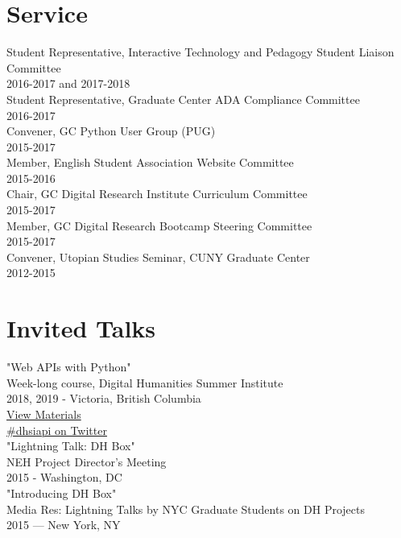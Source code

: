 \documentclass[11pt]{article}
\begin{document}
\section*{Service}
\label{sec:orgheadline6}
Student Representative, Interactive Technology and Pedagogy Student Liaison Committee\\
2016-2017 and 2017-2018\\

Student Representative, Graduate Center ADA Compliance Committee\\
2016-2017\\

Convener, GC Python User Group (PUG)\\
2015-2017\\

Member, English Student Association Website Committee\\
2015-2016\\

Chair, GC Digital Research Institute Curriculum Committee\\
2015-2017\\

Member, GC Digital Research Bootcamp Steering Committee\\
2015-2017\\

Convener, Utopian Studies Seminar, CUNY Graduate Center\\
2012-2015\\
\section*{Invited Talks}
\label{sec:orgheadline7}
"Web APIs with Python"\\
Week-long course, Digital Humanities Summer Institute\\
2018, 2019 - Victoria, British Columbia\\
\href{https://github.com/szweibel/DHSI-API-workshop#web-apis-with-python}{View Materials}\\
\href{https://twitter.com/search?q=\%2523dhsiapi&src=typd}{\#dhsiapi on Twitter}\\

"Lightning Talk: DH Box"\\
NEH Project Director's Meeting\\
2015 - Washington, DC\\

"Introducing DH Box"\\
Media Res: Lightning Talks by NYC Graduate Students on DH Projects\\
2015 — New York, NY\\
\end{document}
